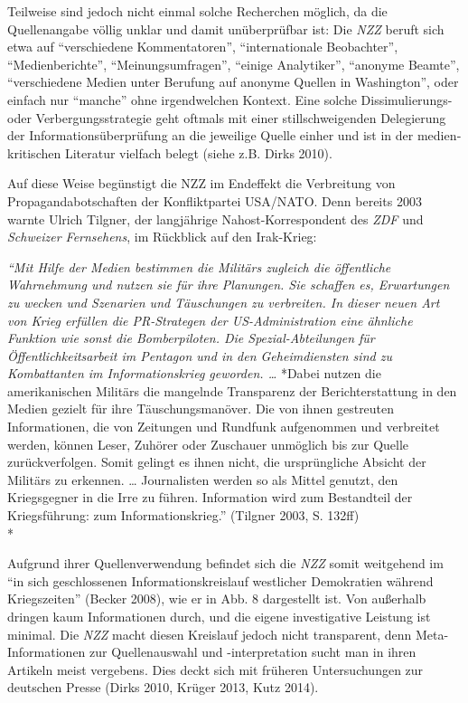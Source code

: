 Teilweise sind jedoch nicht einmal solche Recherchen möglich, da die
Quellenangabe völlig unklar und damit unüberprüfbar ist: Die \emph{NZZ}
beruft sich etwa auf ``verschiedene Kommentatoren'', ``internationale
Beobachter'', ``Medienberichte'', ``Meinungsumfragen'', ``einige
Analytiker'', ``anonyme Beamte'', ``verschiedene Medien unter Berufung
auf anonyme Quellen in Washington'', oder einfach nur ``manche'' ohne
irgendwelchen Kontext. Eine solche Dissimulierungs- oder
Verbergungs­strategie geht oftmals mit einer stillschweigenden
Delegierung der Informations­überprüfung an die jeweilige Quelle einher
und ist in der medien­kritischen Literatur vielfach belegt (siehe z.B.
Dirks 2010).

Auf diese Weise begünstigt die NZZ im Endeffekt die Verbreitung von
Propagandabotschaften der Konfliktpartei USA/NATO. Denn bereits 2003
warnte Ulrich Tilgner, der langjährige Nahost-Korrespondent des
\emph{ZDF} und \emph{Schweizer Fernsehens}, im Rückblick auf den
Irak-Krieg:

\emph{``Mit Hilfe der Medien bestimmen die Militärs zugleich die
öffentliche Wahrnehmung und nutzen sie für ihre Planungen. Sie schaffen
es, Erwartungen zu wecken und Szenarien und Täuschungen zu verbreiten.
In dieser neuen Art von Krieg erfüllen die PR-Strategen der
US-Administration eine ähnliche Funktion wie sonst die Bomberpiloten.
Die Spezial-Abteilungen für Öffentlichkeits­arbeit im Pentagon und in
den Geheim­diensten sind zu Kombattanten im Informationskrieg geworden.
\ldots{}} *Dabei nutzen die amerikanischen Militärs die mangelnde
Transparenz der Berichterstattung in den Medien gezielt für ihre
Täuschungs­manöver. Die von ihnen gestreuten Informationen, die von
Zeitungen und Rundfunk aufgenommen und verbreitet werden, können Leser,
Zuhörer oder Zuschauer unmöglich bis zur Quelle zurückverfolgen. Somit
gelingt es ihnen nicht, die ursprüngliche Absicht der Militärs zu
erkennen. \ldots{} Journalisten werden so als Mittel genutzt, den
Kriegsgegner in die Irre zu führen. Information wird zum Bestandteil der
Kriegsführung: zum Informationskrieg.'' (Tilgner 2003, S. 132ff)\\
*

Aufgrund ihrer Quellenverwendung befindet sich die \emph{NZZ} somit
weitgehend im ``in sich geschlossenen Informations­kreislauf westlicher
Demokratien während Kriegszeiten'' (Becker 2008), wie er in Abb. 8
dargestellt ist. Von außerhalb dringen kaum Informationen durch, und die
eigene investigative Leistung ist minimal. Die \emph{NZZ} macht diesen
Kreislauf jedoch nicht transparent, denn Meta-Informationen zur
Quellenauswahl und -interpretation sucht man in ihren Artikeln meist
vergebens. Dies deckt sich mit früheren Untersuchungen zur deutschen
Presse (Dirks 2010, Krüger 2013, Kutz 2014).

